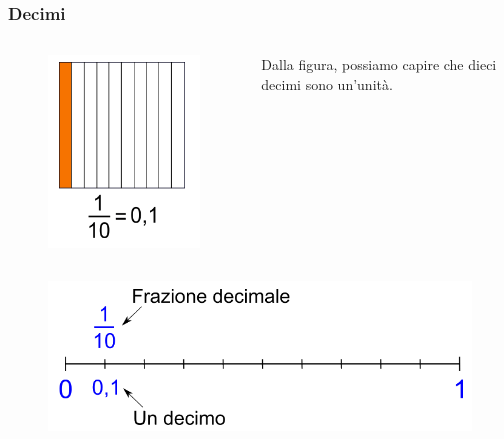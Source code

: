 \documentclass[handout]{beamer}
\theoremstyle{plain}
\begin{document}
\begin{frame}
\frametitle{Decimi}
\begin{columns}
  \begin{column}{0.3\textwidth}
  \begin{figure}
    \includegraphics[width=\columnwidth]{img/decimi1.png}
  \end{figure}    
  \end{column}
  \begin{column}{0.6\textwidth}
    Dalla figura, possiamo capire che \alert{dieci decimi sono un'unità}.

    ~
  \end{column}
\end{columns}
\begin{figure}
  \includegraphics[width=.8\columnwidth]{img/decimi2.png}
\end{figure}
\end{frame}
\end{document}
